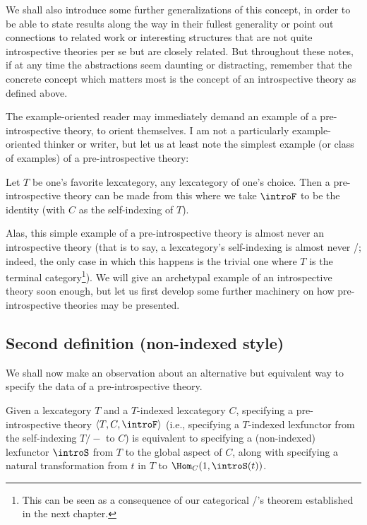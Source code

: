 We shall also introduce some further generalizations of this concept, in order to be able to state results along the way in their fullest generality or point out connections to related work or interesting structures that are not quite introspective theories per se but are closely related. But throughout these notes, if at any time the abstractions seem daunting or distracting, remember that the concrete concept which matters most is the concept of an introspective theory as defined above.

The example-oriented reader may immediately demand an example of a pre-introspective theory, to orient themselves. I am not a particularly example-oriented thinker or writer, but let us at least note the simplest example (or class of examples) of a pre-introspective theory:

\begin{example} \label{TrivialPreIntrospIndexed}
Let $T$ be one's favorite lexcategory, any lexcategory of one's choice. Then a pre-introspective theory can be made from this where we take $\introF$ to be the identity (with $C$ as the self-indexing of $T$).
\end{example}

Alas, this simple example of a pre-introspective theory is almost never an introspective theory (that is to say, a lexcategory's self-indexing is almost never \repsmall/; indeed, the only case in which this happens is the trivial one where $T$ is the terminal category\footnote{This can be seen as a consequence of our categorical \Loeb/'s theorem established in the next chapter.}). We will give an archetypal example of an introspective theory soon enough, but let us first develop some further machinery on how pre-introspective theories may be presented.

\subsection{Second definition (non-indexed style)}

We shall now make an observation about an alternative but equivalent way to specify the data of a pre-introspective theory.

\begin{theorem}\label{SNCorrespondence}
Given a lexcategory $T$ and a $T$-indexed lexcategory $C$, specifying a pre-introspective theory $\langle T, C, \introF \rangle$ (i.e., specifying a $T$-indexed lexfunctor from the self-indexing $T/-$ to $C$) is equivalent to specifying a (non-indexed) lexfunctor $\introS$ from $T$ to the global aspect of $C$, along with specifying a natural transformation from $t$ in $T$ to $\Hom_C(1, \introS(t))$.
\end{theorem}

